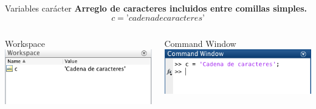 \documentclass{bredelebeamer}
\begin{document}
\begin{frame}{Variables carácter}
\textbf{Arreglo de caracteres incluidos entre comillas simples.}
\begin{equation*}
c = \textbf{'}cadena de caracteres\textbf{'}
\end{equation*}
\begin{columns}
\begin{column}{0.5\textwidth}
\begin{center}
Workspace\\
\includegraphics[scale=0.5]{images/pantalla12.png}
\end{center}
\end{column}
\begin{column}{0.5\textwidth}
\begin{center}
Command Window\\
\includegraphics[scale=0.5]{images/pantalla13.png}
\end{center}
\end{column}
\end{columns}
\end{frame}
\end{document}

